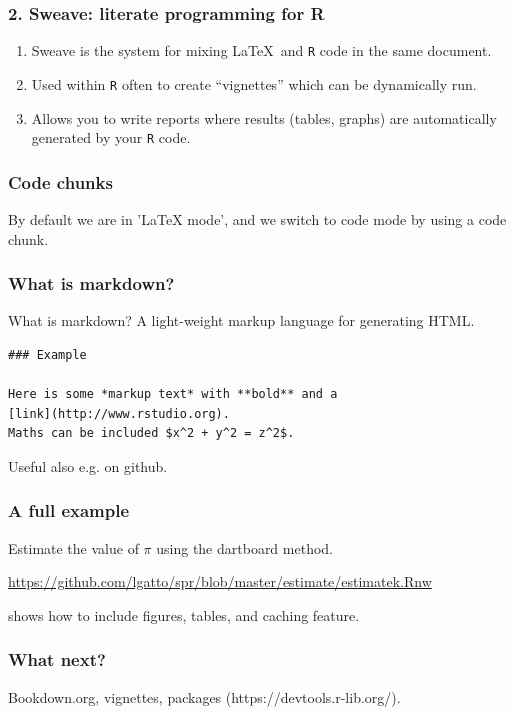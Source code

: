 \documentclass[]{beamer}\usepackage[]{graphicx}\usepackage[]{color}
\newcommand{\R}{\texttt{R} }
\begin{document}
\begin{frame}
  \frametitle{2. Sweave: literate programming for R}

  \begin{enumerate}
  \item Sweave is the system for mixing \LaTeX\ and \R code in the same
    document.

  \item Used within \R often to create ``vignettes'' which can be
    dynamically run.

  \item Allows you to write reports where results (tables, graphs) are
    automatically generated by your \R code.
  \end{enumerate}
\end{frame}


\begin{frame}[fragile]
  \frametitle{Code chunks}

  By default we are in 'LaTeX mode', and we switch to code mode by using
  a code chunk.

  
  
\end{frame}


\begin{frame}[fragile]
  \frametitle{What is markdown?}

  What is markdown?  A light-weight markup language for generating HTML.
\begin{verbatim}
### Example

Here is some *markup text* with **bold** and a
[link](http://www.rstudio.org).
Maths can be included $x^2 + y^2 = z^2$.
\end{verbatim}

  Useful also e.g. on github.
  

\end{frame}


\begin{frame}
  \frametitle{A full example}

  Estimate the value of $\pi$ using the dartboard method.

  \url{https://github.com/lgatto/spr/blob/master/estimate/estimatek.Rnw}

  shows how to include figures, tables, and caching feature.
\end{frame}


\begin{frame}
  \frametitle{What next?}

  Bookdown.org, vignettes, packages (https://devtools.r-lib.org/).
\end{frame}
\end{document}
